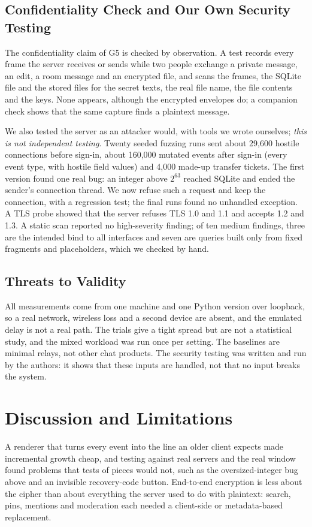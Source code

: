\documentclass[graybox]{svmult}
\begin{document}
\subsection{Confidentiality Check and Our Own Security Testing}
The confidentiality claim of G5 is checked by observation. A test records every frame the server receives or sends while two people exchange a private message, an edit, a room message and an encrypted file, and scans the frames, the SQLite file and the stored files for the secret texts, the real file name, the file contents and the keys. None appears, although the encrypted envelopes do; a companion check shows that the same capture finds a plaintext message.

We also tested the server as an attacker would, with tools we wrote ourselves; \emph{this is not independent testing}. Twenty seeded fuzzing runs sent about 29,600 hostile connections before sign-in, about 160,000 mutated events after sign-in (every event type, with hostile field values) and 4,000 made-up transfer tickets. The first version found one real bug: an integer above $2^{63}$ reached SQLite and ended the sender's connection thread. We now refuse such a request and keep the connection, with a regression test; the final runs found no unhandled exception. A TLS probe showed that the server refuses TLS 1.0 and 1.1 and accepts 1.2 and 1.3. A static scan reported no high-severity finding; of ten medium findings, three are the intended bind to all interfaces and seven are queries built only from fixed fragments and placeholders, which we checked by hand.

\subsection{Threats to Validity}
All measurements come from one machine and one Python version over loopback, so a real network, wireless loss and a second device are absent, and the emulated delay is not a real path. The trials give a tight spread but are not a statistical study, and the mixed workload was run once per setting. The baselines are minimal relays, not other chat products. The security testing was written and run by the authors: it shows that these inputs are handled, not that no input breaks the system.

\section{Discussion and Limitations}
\label{sec:discussion}
A renderer that turns every event into the line an older client expects made incremental growth cheap, and testing against real servers and the real window found problems that tests of pieces would not, such as the oversized-integer bug above and an invisible recovery-code button. End-to-end encryption is less about the cipher than about everything the server used to do with plaintext: search, pins, mentions and moderation each needed a client-side or metadata-based replacement.
\end{document}
